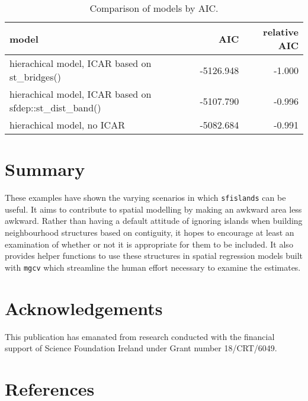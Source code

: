 \begin{table}

\caption{\label{tab:aic-latex}Comparison of models by AIC.}
\centering
\fontsize{8}{10}\selectfont
\begin{tabular}[t]{l|r|r}
\hline
model & AIC & relative AIC\\
\hline
hierachical model, ICAR based on st\_bridges() & -5126.948 & -1.000\\
\hline
hierachical model, ICAR based on sfdep::st\_dist\_band() & -5107.790 & -0.996\\
\hline
hierachical model, no ICAR & -5082.684 & -0.991\\
\hline
\end{tabular}
\end{table}

\hypertarget{summary}{%
\section{Summary}\label{summary}}

These examples have shown the varying scenarios in which \texttt{sfislands} can be useful. It aims to contribute to spatial modelling by making an awkward area less awkward. Rather than having a default attitude of ignoring islands when building neighbourhood structures based on contiguity, it hopes to encourage at least an examination of whether or not it is appropriate for them to be included. It also provides helper functions to use these structures in spatial regression models built with \texttt{mgcv} which streamline the human effort necessary to examine the estimates.

\hypertarget{acknowledgements}{%
\section{Acknowledgements}\label{acknowledgements}}

This publication has emanated from research conducted with the financial support of Science Foundation Ireland under Grant number 18/CRT/6049.

\hypertarget{references}{%
\section*{References}\label{references}}


